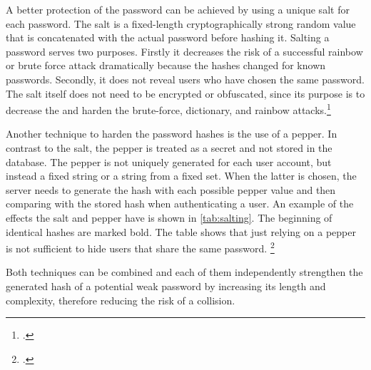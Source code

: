 A better protection of the password can be achieved by using a unique \frqq salt\flqq{} for each password. The salt is a fixed-length cryptographically strong random value that is concatenated with the actual password before hashing it. Salting a password serves two purposes. Firstly it decreases the risk of a successful rainbow or brute force attack dramatically because the hashes changed for known passwords. Secondly, it does not reveal users who have chosen the same password. The salt itself does not need to be encrypted or obfuscated, since its purpose is to decrease the and harden the brute-force, dictionary, and rainbow attacks.\footcites[See][32--34]{IdentityandDataSecurityforWebDevelopment}[See][130--131]{brotherston2017defensive}[See][15]{SP80063B}

Another technique to harden the password hashes is the use of a \frqq pepper\flqq{}. In contrast to the salt, the pepper is treated as a secret and not stored in the database. The pepper is not uniquely generated for each user account, but instead a fixed string or a string from a fixed set. When the latter is chosen, the server needs to generate the hash with each possible pepper value and then comparing with the stored hash when authenticating a user.  An example of the effects the salt and pepper have is shown in \autoref{tab:salting}. The beginning of identical hashes are marked bold. The table shows that just relying on a pepper is not sufficient to hide users that share the same password. \footcites[See][33--35]{IdentityandDataSecurityforWebDevelopment}[See][15]{SP80063B}[See][173]{MANBER1996171}

Both techniques can be combined and each of them independently strengthen the generated hash of a potential weak password by increasing its length and complexity, therefore reducing the risk of a collision.

